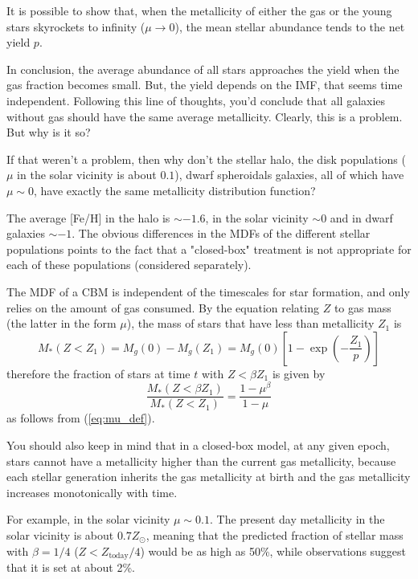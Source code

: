 It is possible to show that, when the metallicity of either the gas or the young stars skyrockets to infinity ($\mu \to 0$), the mean stellar abundance tends to the net yield $p$.
\par In conclusion, the average abundance of all stars approaches the yield when the gas fraction becomes small. But, the yield depends on the IMF, that seems time independent. Following this line of thoughts, you'd conclude that all galaxies without gas should have the same average metallicity. Clearly, this is a problem. But why is it so?
\par If that weren't a problem, then why don't the stellar halo, the disk populations ($\mu$ in the solar vicinity is about $0.1$), dwarf spheroidals galaxies, all of which have $\mu \sim 0$, have exactly the same metallicity distribution function?
\par The average [Fe/H] in the halo is $\sim -1.6$, in the solar vicinity $\sim 0$ and in dwarf galaxies $\sim -1$. The obvious differences in the MDFs of the different stellar populations points to the fact that a "closed-box" treatment is not appropriate for each of these populations (considered separately).
\par The MDF of a CBM is independent of the timescales for star formation, and only relies on the amount of gas consumed. By the equation relating $Z$ to gas mass (the latter in the form $\mu$), the mass of stars that have less than metallicity $Z_{1}$ is
\begin{equation*}
    M_{*}(Z<Z_{1}) = M_{g}(0)-M_{g}(Z_{1}) = M_{g}(0)\left[1-\exp\left(-\frac{Z_{1}}{p}\right)\right]
\end{equation*}
therefore the fraction of stars at time $t$ with $Z<\beta Z_{1}$ is given by
\begin{equation*}
    \frac{M_{*}(Z<\beta Z_{1})}{M_{*}(Z<Z_{1})} = \frac{1-\mu^{\beta}}{1-\mu}
\end{equation*}
as follows from (\ref{eq:mu_def}).
\par You should also keep in mind that in a closed-box model, at any given epoch, stars cannot have a metallicity higher than the current gas metallicity, because each stellar generation inherits the gas metallicity at birth and the gas metallicity increases monotonically with time.
\par For example, in the solar vicinity $\mu \sim 0.1$. The present day metallicity in the solar vicinity is about $0.7Z_{\odot}$, meaning that the predicted fraction of stellar mass with $\beta = 1/4$ ($Z<Z_{\text{today}}/4$) would be as high as 50\%, while observations suggest that it is set at about 2\%.
